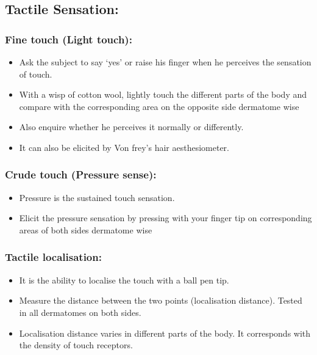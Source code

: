 \documentclass[a4paper,12pt,openany,oneside]{book}
\begin{document}
\subsection*{Tactile Sensation:}
\subsubsection*{Fine touch (Light touch):}
\begin{itemize}
\item{ Ask the subject to say ‘yes’ or raise his finger when he perceives the sensation of touch.}
\item{ With a wisp of cotton wool, lightly touch the different parts of the body and compare with the corresponding area on the opposite side dermatome wise}
\item{ Also enquire whether he perceives it normally or differently.}
\item{ It can also be elicited by Von frey’s hair aesthesiometer.}
\end{itemize}

\subsubsection*{Crude touch (Pressure sense):}
\begin{itemize}
\item{Pressure is the sustained touch sensation.}
\item{Elicit the pressure sensation by pressing with your finger tip on 	corresponding areas of both sides dermatome wise}
\end{itemize}

\subsubsection*{Tactile localisation:}
\begin{itemize}
\item{It is the ability to localise the touch with a ball pen tip.}
\item{Measure the distance between the two points (localisation distance).  Tested in all dermatomes on both sides.}
\item{Localisation distance varies in different parts of the body. It corresponds with the density of touch receptors.}
\end{itemize}
\end{document}
